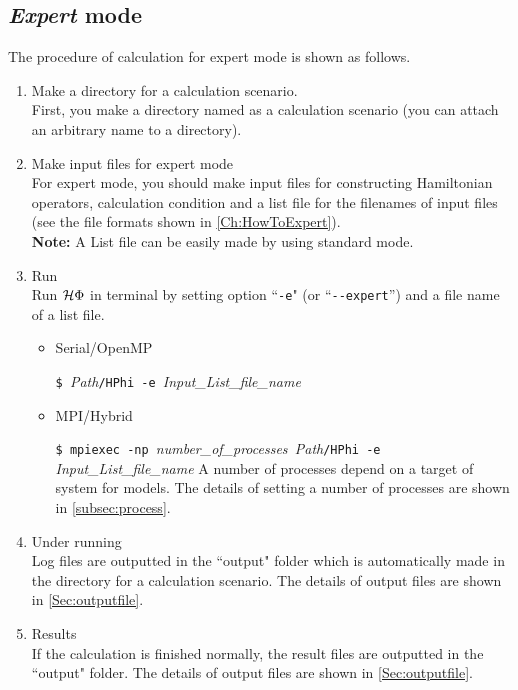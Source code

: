 \subsection{{\it Expert} mode}
The procedure of calculation for expert mode is shown as follows.
 \begin{enumerate}
   \item  Make a directory for a calculation scenario. \\
First, you make a directory named as a calculation scenario (you can attach an arbitrary name to a directory).
   \item  Make input files for expert mode\\
For expert mode,  you should make input files 
for constructing Hamiltonian operators, calculation condition and 
a list file for the filenames of input files (see the file formats shown in  \ref{Ch:HowToExpert}). \\
{\bf Note:} A List file can be easily made by using standard mode.
 \item  Run\\
Run $\mathcal{H} \Phi$ in terminal by setting option ``\verb|-e|" (or ``\verb|--expert|'') and a file name of a list file.\\

\begin{itemize}

\item Serial/OpenMP

  \verb|$ |\textit{Path}\verb|/HPhi -e |\textit{Input\_List\_file\_name}
  
\item MPI/Hybrid

  \verb|$ mpiexec -np |\textit{number\_of\_processes}\verb| |\textit{Path}\verb|/HPhi -e |\textit{Input\_List\_file\_name}
 {A number of processes depend on a target of system for models. The details of setting a number of processes are shown in  \ref{subsec:process}.}
\end{itemize}

\item Under running\\
Log files are outputted in the ``output" folder which is automatically made in the directory for a calculation scenario.
The details of output files are shown in \ref{Sec:outputfile}.

\item Results\\
If the calculation is finished normally, the result files are outputted in  the ``output" folder. The details of output files are shown in \ref{Sec:outputfile}.
\end{enumerate}



